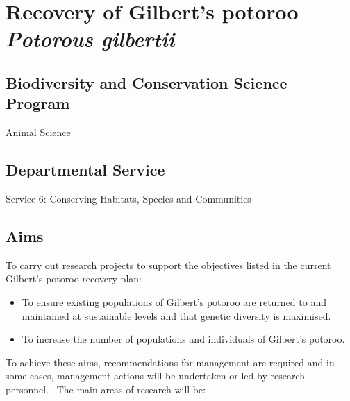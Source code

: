 \documentclass[version=last,
    paper=a4,                               %
    10pt,                                   %
    dvipsnames,
    oneside,                              %
    headings=openany,                       %
    open=any,
    BCOR=7mm,                               %
    DIV=15,     %
]{scrbook}
\providecommand{\tightlist}{\setlength{\itemsep}{0pt}\setlength{\parskip}{0pt}}
\begin{document}
\section*{Recovery of Gilbert's potoroo \emph{Potorous gilbertii}
}



\subsection*{Biodiversity and Conservation Science Program}

Animal Science




\subsection*{Departmental Service}

Service 6: Conserving Habitats, Species and Communities




\subsection*{Aims}

To carry out research projects to support the objectives listed in the
current Gilbert's potoroo recovery plan:

\begin{itemize}
\tightlist
\item
  To ensure existing populations of Gilbert's potoroo are returned to
  and maintained at sustainable levels and that genetic diversity is
  maximised.
\item
  To increase the number of populations and individuals of Gilbert's
  potoroo.
\end{itemize}

To achieve these aims, recommendations for management are required and
in some cases, management actions will be undertaken or led by research
personnel.~ The main areas of research will be:
\end{document}
